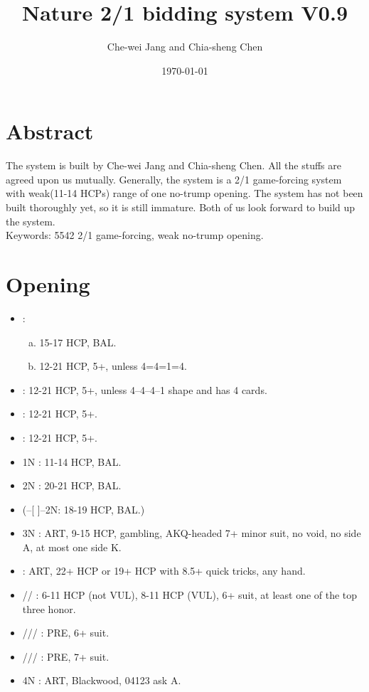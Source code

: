\documentclass[12pt,twoside,a5paper]{report}%
\begin{document}
\title{Nature 2/1 bidding system V0.9}
\author{Che-wei Jang and Chia-sheng Chen}
\date{\today}
\maketitle
\tableofcontents


\chapter*{Abstract}
	The system is built by Che-wei Jang and Chia-sheng Chen. All the stuffs are agreed upon us mutually. Generally, the system is a 2/1 game-forcing system with weak(11-14 HCPs) range of one no-trump opening.
	The system has not been built thoroughly yet, so it is still immature. Both of us look forward to build up the system.\\
	Keywords: 5542 2/1 game-forcing, weak no-trump opening.
\chapter*{Opening}
	\begin{itemize}
	\renewcommand{\labelitemi}{}
		\item {}: 
		\begin{enumerate}[(a)]
			\item 15-17 HCP, BAL.
			\item 12-21 HCP, 5+\cl{}, unless 4=4=1=4.
		\end{enumerate}
		\item {} : 12-21 HCP, 5+\di{}, unless 4--4--4--1 shape and \di{} has 4 cards.
		\item {} : 12-21 HCP, 5+\he{}.
		\item {} : 12-21 HCP, 5+\sp{}.
		\item 1N : 11-14 HCP, BAL.
		\item 2N : 20-21 HCP, BAL.
		\item (--[ ]--2N: 18-19 HCP, BAL.)
		\item 3N : ART, 9-15 HCP, gambling, AKQ-headed 7+ minor suit, no void, no side A, at most one side K.
		\item {} : ART, 22+ HCP or 19+ HCP with 8.5+ quick tricks, any hand.
		\item {}/\he{}/\sp{} : 6-11 HCP (not VUL), 8-11 HCP (VUL), 6+ suit, at least one of the top three honor.
		\item {}/\di{}/\he{}/\sp{} : PRE, 6+ suit.
		\item {}/\di{}/\he{}/\sp{} : PRE, 7+ suit.
		\item 4N : ART, Blackwood, 04123 ask A.
	\end{itemize}
\end{document}

